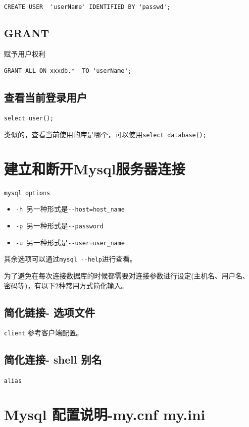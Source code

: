 \documentclass[UTF8,a4paper,12pt]{ctexbook}
\begin{document}
			\verb|CREATE USER  'userName' IDENTIFIED BY 'passwd';| 
			
		\subsection{GRANT}
			赋予用户权利
			
			\verb|GRANT ALL ON xxxdb.*  TO 'userName';| 
	
		
		\subsection{查看当前登录用户}
		
			\verb|select user();|
			
			类似的，查看当前使用的库是哪个，可以使用\verb|select database();|
			
	\section{建立和断开Mysql服务器连接}
		\verb|mysql options|
		
		\begin{itemize}[itemindent = 1em]
			\item \verb|-h |另一种形式是\verb|--host=host_name|
			\item \verb|-p |另一种形式是\verb|--password|
			\item \verb|-u |另一种形式是\verb|--user=user_name|
		\end{itemize}
		
			其余选项可以通过\verb|mysql --help|进行查看。
				
			为了避免在每次连接数据库的时候都需要对连接参数进行设定(主机名、用户名、密码等)，有以下2种常用方式简化输入。
			
		\subsection{简化链接- 选项文件}
			\verb|client| 参考客户端配置。
		
		\subsection{简化连接- shell 别名}
			\verb|alias| 
		
		
	
	\newpage
	\section{Mysql 配置说明-my.cnf my.ini}
		
\end{document}
